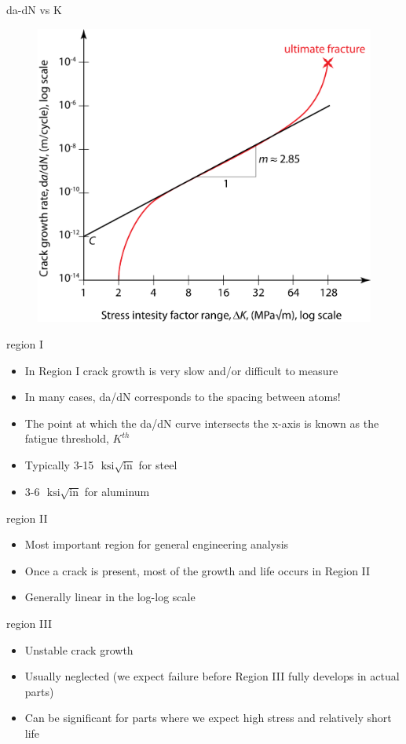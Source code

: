 \documentclass[10pt]{beamer}
\begin{document}
\begin{frame}{da-dN vs K}	
	\begin{figure}
	\centering
	\includegraphics[width=0.7\linewidth]{../Figures/da-dn}
	\label{fig:da-dn}
	\end{figure}
\end{frame}

\begin{frame}{region I}
	\begin{itemize}[<+->]
		\item In Region I crack growth is very slow and/or difficult to measure
		\item In many cases, da/dN corresponds to the spacing between atoms!
		\item The point at which the da/dN curve intersects the x-axis is known as the fatigue threshold, $K^{th}$
		\item Typically 3-15 $\text{ ksi} \sqrt{\text{in}}$ for steel
		\item 3-6 $\text{ ksi} \sqrt{\text{in}}$ for aluminum
	\end{itemize}
\end{frame}

\begin{frame}{region II}
	\begin{itemize}[<+->]
		\item Most important region for general engineering analysis
		\item Once a crack is present, most of the growth and life occurs in Region II
		\item Generally linear in the log-log scale
	\end{itemize}
\end{frame}

\begin{frame}{region III}
	\begin{itemize}[<+->]
		\item Unstable crack growth
		\item Usually neglected (we expect failure before Region III fully develops in actual parts)
		\item Can be significant for parts where we expect high stress and relatively short life
	\end{itemize}
\end{frame}
\end{document}
